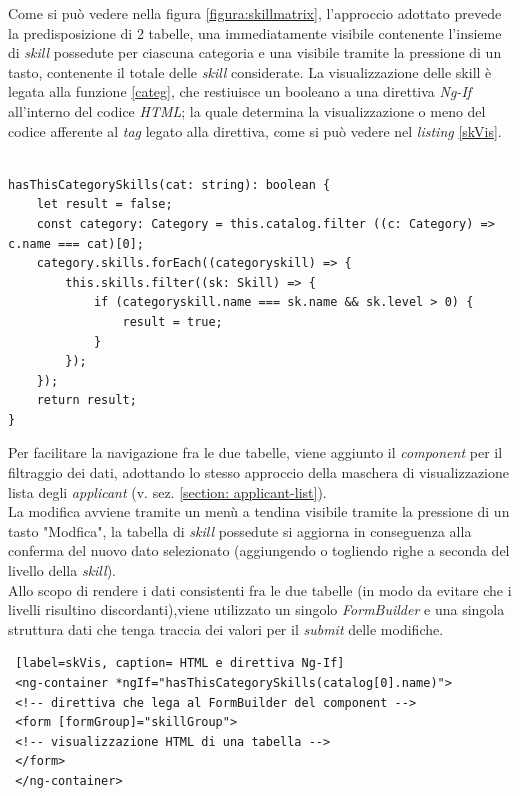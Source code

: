 Come si può vedere nella figura \ref{figura:skillmatrix}, l'approccio adottato prevede la predisposizione di 2 tabelle, una immediatamente visibile contenente l'insieme di \textit{skill} possedute per ciascuna categoria e una visibile tramite la pressione di un tasto, contenente il totale delle \textit{skill} considerate. La visualizzazione delle skill è legata alla funzione \ref{categ}, che restiuisce un booleano a una direttiva \textit{Ng-If} all'interno del codice \textit{HTML}; la quale determina la visualizzazione o meno del codice afferente al \textit{tag} legato alla direttiva, come si può vedere nel \textit{listing} \ref{skVis}.\\
\newpage
\begin{lstlisting}[label=categ, caption=Funzione che determina la visualizzazione di una categoria avente \textit{skills} possedute ]

hasThisCategorySkills(cat: string): boolean {
	let result = false;
	const category: Category = this.catalog.filter ((c: Category) => c.name === cat)[0];
	category.skills.forEach((categoryskill) => {
		this.skills.filter((sk: Skill) => {
			if (categoryskill.name === sk.name && sk.level > 0) {
				result = true;
			}
		});
	});
	return result;
}

\end{lstlisting}

Per facilitare la navigazione fra le due tabelle, viene aggiunto il \textit{component} per il filtraggio dei dati, adottando lo stesso approccio della maschera di visualizzazione lista degli \textit{applicant} (v. sez. \ref{section: applicant-list}).\\
La modifica avviene tramite un menù a tendina visibile tramite la pressione di un tasto "Modfica", la tabella di \textit{skill} possedute si aggiorna in conseguenza alla conferma del nuovo dato selezionato (aggiungendo o togliendo righe a seconda del livello della \textit{skill}).\\
Allo scopo di rendere i dati consistenti fra le due tabelle (in modo da evitare che i livelli risultino discordanti),viene utilizzato un singolo \textit{FormBuilder} e una singola struttura dati che tenga traccia dei valori per il \textit{submit} delle modifiche.\\
 
 
 \begin{lstlisting} [label=skVis, caption= HTML e direttiva Ng-If]
 <ng-container *ngIf="hasThisCategorySkills(catalog[0].name)">
 <!-- direttiva che lega al FormBuilder del component -->
 <form [formGroup]="skillGroup">
 <!-- visualizzazione HTML di una tabella -->
 </form>
 </ng-container>
 \end{lstlisting}
   